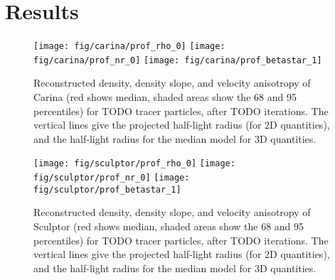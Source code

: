 \section{Results}\label{sec:results}

\begin{figure*}
    \begin{center}
        \texttt{[image: fig/carina/prof\_rho\_0]}
        \texttt{[image: fig/carina/prof\_nr\_0]}
        \texttt{[image: fig/carina/prof\_betastar\_1]}
        \caption{Reconstructed density, density slope, and velocity
          anisotropy of Carina (red shows median, shaded areas
          show the 68 and 95 percentiles) for TODO tracer particles, after
          TODO iterations. The vertical lines give the projected
          half-light radius (for 2D quantities), and the half-light
          radius for the median model for 3D quantities.}
        \label{fig:carina}
    \end{center}
\end{figure*}

\begin{figure*}
    \begin{center}
        \texttt{[image: fig/sculptor/prof\_rho\_0]}
        \texttt{[image: fig/sculptor/prof\_nr\_0]}
        \texttt{[image: fig/sculptor/prof\_betastar\_1]}
        \caption{Reconstructed density, density slope, and velocity
          anisotropy of Sculptor (red shows median, shaded areas
          show the 68 and 95 percentiles) for TODO tracer particles, after
          TODO iterations. The vertical lines give the projected
          half-light radius (for 2D quantities), and the half-light
          radius for the median model for 3D quantities.}
        \label{fig:sculptor}
    \end{center}
\end{figure*}


